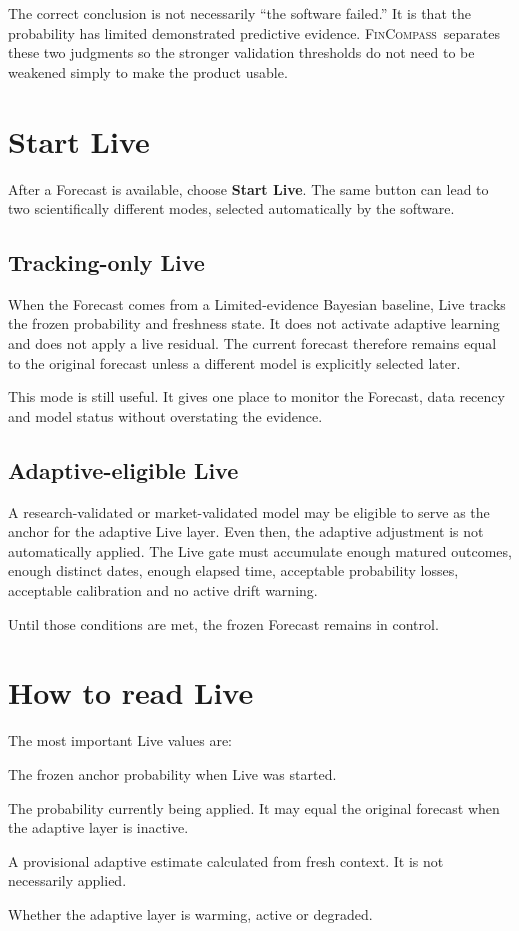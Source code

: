 \documentclass[11pt]{article}
\newcommand{\FC}{\textsc{FinCompass}}
\begin{document}
The correct conclusion is not necessarily ``the software failed.'' It is that the probability has limited demonstrated predictive evidence. \FC\ separates these two judgments so the stronger validation thresholds do not need to be weakened simply to make the product usable.

\section{Start Live}
After a Forecast is available, choose \textbf{Start Live}. The same button can lead to two scientifically different modes, selected automatically by the software.

\subsection{Tracking-only Live}
When the Forecast comes from a Limited-evidence Bayesian baseline, Live tracks the frozen probability and freshness state. It does not activate adaptive learning and does not apply a live residual. The current forecast therefore remains equal to the original forecast unless a different model is explicitly selected later.

This mode is still useful. It gives one place to monitor the Forecast, data recency and model status without overstating the evidence.

\subsection{Adaptive-eligible Live}
A research-validated or market-validated model may be eligible to serve as the anchor for the adaptive Live layer. Even then, the adaptive adjustment is not automatically applied. The Live gate must accumulate enough matured outcomes, enough distinct dates, enough elapsed time, acceptable probability losses, acceptable calibration and no active drift warning.

Until those conditions are met, the frozen Forecast remains in control.

\section{How to read Live}
The most important Live values are:
\begin{description}[style=nextline]
\item[Original forecast] The frozen anchor probability when Live was started.
\item[Current forecast] The probability currently being applied. It may equal the original forecast when the adaptive layer is inactive.
\item[Candidate forecast] A provisional adaptive estimate calculated from fresh context. It is not necessarily applied.
\item[Evidence status] Whether the adaptive layer is warming, active or degraded.
\end{description}
\end{document}
